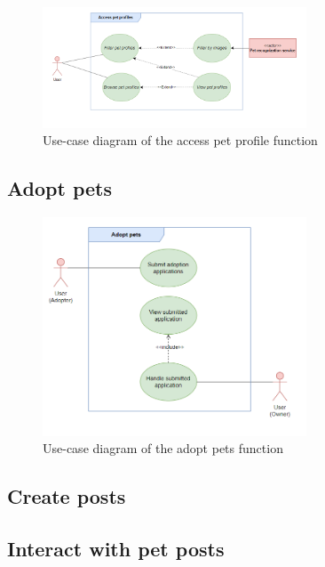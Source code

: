 \begin {figure}[H]
\centering
\includegraphics[width=0.7\textwidth]{Figures/access_pet_ucd.png}
\caption{Use-case diagram of the access pet profile function}
\label{fig:access-pet-activity-diagram}
\end{figure}



\subsection{Adopt pets}

\begin {figure}[H]
\centering
\includegraphics[width=0.7\textwidth]{Figures/adopt_pet_ucd.png}
\caption{Use-case diagram of the adopt pets function}
\label{fig:adopt-pet-activity-diagram}
\end{figure}



\subsection{Create posts}



\subsection{Interact with pet posts}

